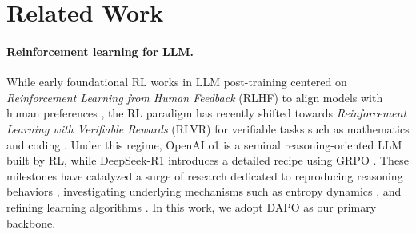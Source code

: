 \section{Related Work}
\paragraph{Reinforcement learning for LLM.}
While early foundational RL works in LLM post-training centered on \textit{Reinforcement Learning from Human Feedback} (RLHF) to align models with human preferences \citep{rlhf-stiennon2020learning, ouyang2022training}, the RL paradigm has recently shifted towards \textit{Reinforcement Learning with Verifiable Rewards} (RLVR) for verifiable tasks such as mathematics and coding \citep{tulu-RLVR}.
Under this regime, OpenAI o1 \citep{Openai-O1} is a seminal reasoning-oriented LLM built by RL, while DeepSeek-R1 \citep{Deepseek-R1} introduces a detailed recipe using GRPO \citep{GRPO}.
These milestones have catalyzed a surge of research dedicated to reproducing reasoning behaviors \citep{ORZ, DAPO}, investigating underlying mechanisms such as entropy dynamics \citep{yue2025does, entropy-mechanism, entropy-80}, and refining learning algorithms \citep{Dr.GRPO, QAE, GMPO}.
In this work, we adopt DAPO \citep{DAPO} as our primary backbone.


